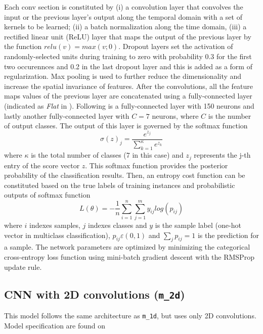 Each conv section is constituted by (i) a convolution layer that convolves the input or the previous layer's output along the temporal domain with a set of kernels to be learned; (ii) a batch normalization along the time domain, (iii)  a rectified linear unit (ReLU) layer that maps the output of the previous layer by the function $ relu(v) = max(v; 0) $. Dropout layers set the activation of \mbox{randomly-selected} units during training to zero with probability 0.3 for the first two occurennces and 0.2 in the last dropout layer and this is added as a form of regularization. Max pooling is used to further reduce the dimensionality and increase the spatial invariance of features. After the convolutions, all the feature maps values of the previous layer are concatenated using a \mbox{fully-connected} layer (indicated as {\it Flat} in ). Following is a \mbox{fully-connected} layer with 150 neurons and lastly another \mbox{fully-connected} layer with $C=7$ neurons, where $C$ is the number of output classes.
The output of this layer is governed by the softmax function
$$ \sigma(z)_j = \frac{e^{z_j}}{\sum_{k=1}^{\kappa} e^{z_k}} $$
where $ \kappa $ is the total number of classes (7 in this case) and $ z_j $ represents the j-th entry of the score vector $ z $.
This softmax function provides the posterior probability of the classification results. Then, an entropy cost function can be constituted based on the true labels of training instances and probabilistic outputs of softmax function
$$ L(\theta) = -\frac{1}{n} \sum_{i=1}^{n} \sum_{j=1}^{m} y_{ij} log(p_{ij}) $$
where $i$ indexes samples, $j$ indexes classes and $y$ is the sample label (one-hot vector in multiclass classification), $p_{ij} \varepsilon (0,1)$ and $\sum_{j} p_{ij} = 1$ is the prediction for a sample.
The network parameters are optimized by minimizing the categorical cross-entropy loss function using mini-batch gradient descent with the RMSProp update rule. \\

\subsection{CNN with 2D convolutions (\texttt{m_2d})}
\label{sec:m_2d}
This model follows the same architecture as \texttt{m_1d}, but uses only 2D convolutions. Model specification are found on 

